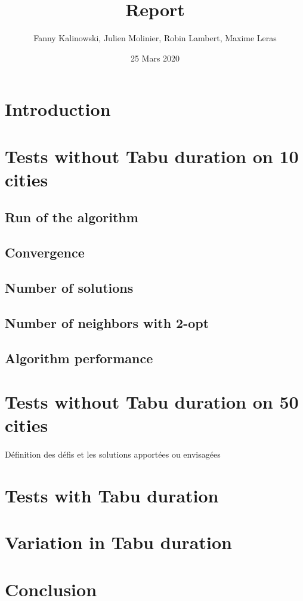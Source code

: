 \documentclass[12pt,oneside,a4paper]{article}
\begin{document}
\title{Report}
\author{Fanny Kalinowski, Julien Molinier, Robin Lambert, Maxime Leras}
\date{25 Mars 2020}
\maketitle
\newpage    
\tableofcontents

\newpage
{}
\section{Introduction}
\paragraph{}




\section{Tests without Tabu duration on 10 cities}
\subsection{Run of the algorithm}

\subsection{Convergence}

\subsection{Number of solutions}

\subsection{Number of neighbors with 2-opt}

\subsection{Algorithm performance}



\section{Tests without Tabu duration on 50 cities}
\paragraph{}
Définition des défis et les solutions apportées ou envisagées

\section{Tests with Tabu duration}

\section{Variation in Tabu duration}

\section{Conclusion}
\paragraph{}
\end{document}
